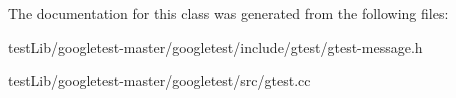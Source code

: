 The documentation for this class was generated from the following files\+:\begin{DoxyCompactItemize}
\item 
test\+Lib/googletest-\/master/googletest/include/gtest/gtest-\/message.\+h\item 
test\+Lib/googletest-\/master/googletest/src/gtest.\+cc\end{DoxyCompactItemize}
